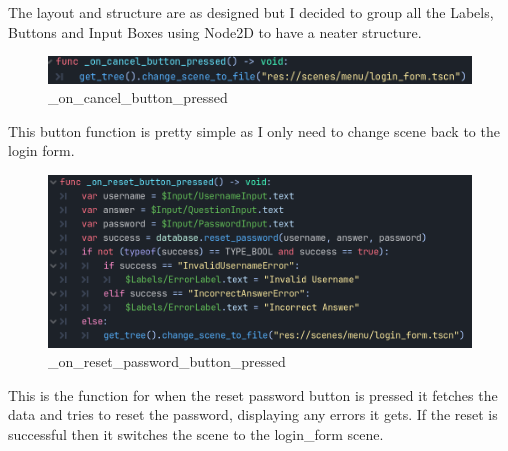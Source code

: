 \documentclass{article}
\begin{document}
        The layout and structure are as designed but I decided to group all the Labels, Buttons and Input Boxes using Node2D to have a neater structure.\\
        \begin{figure}[H]
              \centering
              \includegraphics{images/development/ResetPasswordForm_cancel.PNG}
              \caption{\_on\_cancel\_button\_pressed}
        \end{figure}
        This button function is pretty simple as I only need to change scene back to the login form.\\
        \begin{figure}[H]
                \centering
                \includegraphics{images/development/ResetPasswordForm_reset.PNG}
                \caption{\_on\_reset\_password\_button\_pressed}
        \end{figure}
        \[\]
        This is the function for when the reset password button is pressed it fetches the data and tries to reset the password, displaying any errors it gets. If the reset is successful then it switches the scene to the login\_form scene.\\
\end{document}
